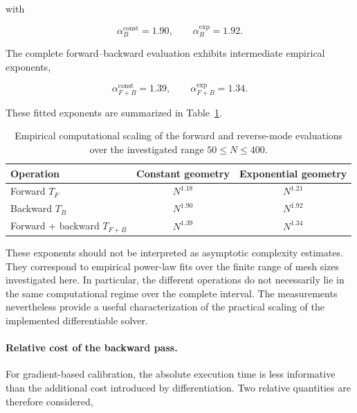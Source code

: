 \documentclass[11pt,a4paper]{report}
\theoremstyle{plain}
\theoremstyle{definition}
\begin{document}
with

\begin{equation}
    \alpha_B^{\mathrm{const}} = 1.90,
    \qquad
    \alpha_B^{\mathrm{exp}} = 1.92.
\end{equation}

The complete forward--backward evaluation exhibits intermediate empirical
exponents,

\begin{equation}
    \alpha_{F+B}^{\mathrm{const}} = 1.39,
    \qquad
    \alpha_{F+B}^{\mathrm{exp}} = 1.34.
\end{equation}

These fitted exponents are summarized in
Table~\ref{tab:backward_scaling}.

\begin{table}[ht!]
    \centering
    \caption{
    Empirical computational scaling of the forward and reverse-mode
    evaluations over the investigated range $50 \leq N \leq 400$.
    }
    \label{tab:backward_scaling}
    \begin{tabular}{lcc}
        \toprule
        Operation
        & Constant geometry
        & Exponential geometry \\
        \midrule
        Forward $T_F$
        & $N^{1.18}$
        & $N^{1.21}$ \\
        Backward $T_B$
        & $N^{1.90}$
        & $N^{1.92}$ \\
        Forward + backward $T_{F+B}$
        & $N^{1.39}$
        & $N^{1.34}$ \\
        \bottomrule
    \end{tabular}
\end{table}

These exponents should not be interpreted as asymptotic complexity estimates.
They correspond to empirical power-law fits over the finite range of mesh
sizes investigated here. In particular, the different operations do not
necessarily lie in the same computational regime over the complete interval.
The measurements nevertheless provide a useful characterization of the
practical scaling of the implemented differentiable solver.

\paragraph{Relative cost of the backward pass.}

For gradient-based calibration, the absolute execution time is less
informative than the additional cost introduced by differentiation. Two
relative quantities are therefore considered,
\end{document}
